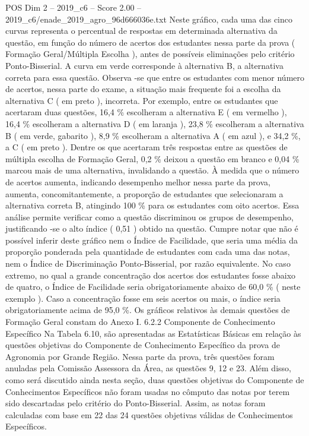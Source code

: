 \begin{textsample}{POS Dim 2 – 2019\_c6 – Score 2.00 – 2019\_c6/enade\_2019\_agro\_96d666036e.txt}
Neste gráfico, cada uma das cinco curvas representa o percentual de respostas em determinada alternativa da questão, em função do número de acertos dos estudantes nessa parte da prova ( Formação Geral/Múltipla Escolha ), antes de possíveis eliminações pelo critério Ponto-Bisserial.
A curva em verde corresponde à alternativa B, a alternativa correta para essa questão.
Observa -se que entre os estudantes com menor número de acertos, nessa parte do exame, a situação mais frequente foi a escolha da alternativa C ( em preto ), incorreta.
Por exemplo, entre os estudantes que acertaram duas questões, 16,4 \% escolheram a alternativa E ( em vermelho ), 16,4 \% escolheram a alternativa D ( em laranja ), 23,8 \% escolheram a alternativa B ( em verde, gabarito ), 8,9 \% escolheram a alternativa A ( em azul ), e 34,2 \%, a C ( em preto ).
Dentre os que acertaram três respostas entre as questões de múltipla escolha de Formação Geral, 0,2 \% deixou a questão em branco e 0,04 \% marcou mais de uma alternativa, invalidando a questão.
À medida que o número de acertos aumenta, indicando desempenho melhor nessa parte da prova, aumenta, concomitantemente, a proporção de estudantes que selecionaram a alternativa correta B, atingindo 100 \% para os estudantes com oito acertos.
Essa análise permite verificar como a questão discriminou os grupos de desempenho, justificando -se o alto índice ( 0,51 ) obtido na questão.
Cumpre notar que não é possível inferir deste gráfico nem o Índice de Facilidade, que seria uma média da proporção ponderada pela quantidade de estudantes com cada uma das notas, nem o Índice de Discriminação Ponto-Bisserial, por razão equivalente.
No caso extremo, no qual a grande concentração dos acertos dos estudantes fosse abaixo de quatro, o Índice de Facilidade seria obrigatoriamente abaixo de 60,0 \% ( neste exemplo ).
Caso a concentração fosse em seis acertos ou mais, o índice seria obrigatoriamente acima de 95,0 \%.
Os gráficos relativos às demais questões de Formação Geral constam do Anexo I. 6.2.2 Componente de Conhecimento Específico Na Tabela 6.10, são apresentadas as Estatísticas Básicas em relação às questões objetivas do Componente de Conhecimento Específico da prova de Agronomia por Grande Região.
Nessa parte da prova, três questões foram anuladas pela Comissão Assessora da Área, as questões 9, 12 e 23.
Além disso, como será discutido ainda nesta seção, duas questões objetivas do Componente de Conhecimentos Específicos não foram usadas no cômputo das notas por terem sido descartadas pelo critério do Ponto-Bisserial.
Assim, as notas foram calculadas com base em 22 das 24 questões objetivas válidas de Conhecimentos Específicos.

\end{textsample}
